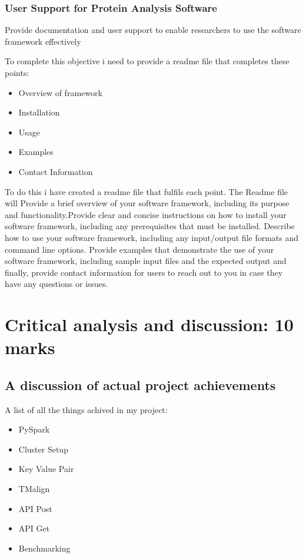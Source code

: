 \documentclass[]{final_report}
\begin{document}
\subsubsection{User Support for Protein Analysis Software}
\begin{displayquote}
    Provide documentation and user support to enable researchers to use the software
    framework effectively
\end{displayquote}

To complete this objective i need to provide a readme file that completes these points:

\begin{itemize}
    \item Overview of framework
    \item Installation
    \item Usage
    \item Examples
    \item Contact Information
\end{itemize}

To do this i have created a readme file that fulfils each point. The Readme file will Provide a brief overview of your software framework, including its purpose and functionality.Provide clear and concise instructions on how to install your software framework, including any prerequisites that must be installed. Describe how to use your software framework, including any input/output file formats and command line options. Provide examples that demonstrate the use of your software framework, including sample input files and the expected output and finally, provide contact information for users to reach out to you in case they have any questions or issues.

\section{Critical analysis and discussion: 10 marks}
\subsection{A discussion of actual project achievements}
A list of all the things achived in my project:

\begin{itemize}
    \item PySpark
    \item Cluster Setup
    \item Key Value Pair
    \item TMalign
    \item API Post
    \item API Get
    \item Benchmarking
\end{itemize}
\end{document}
